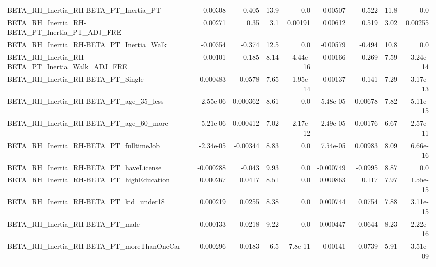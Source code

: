 \begin{tabular}{lrrrrrrrr}
BETA\_RH\_Inertia\_RH-BETA\_PT\_Inertia\_PT              &    -0.00308 &       -0.405 &     13.9 &      0.0 &   -0.00507 &      -0.522 &         11.8 &           0.0 \\
BETA\_RH\_Inertia\_RH-BETA\_PT\_Inertia\_PT\_ADJ\_FRE      &     0.00271 &         0.35 &      3.1 &  0.00191 &    0.00612 &       0.519 &         3.02 &       0.00255 \\
BETA\_RH\_Inertia\_RH-BETA\_PT\_Inertia\_Walk            &    -0.00354 &       -0.374 &     12.5 &      0.0 &   -0.00579 &      -0.494 &         10.8 &           0.0 \\
BETA\_RH\_Inertia\_RH-BETA\_PT\_Inertia\_Walk\_ADJ\_FRE    &     0.00101 &        0.185 &     8.14 & 4.44e-16 &    0.00166 &       0.269 &         7.59 &      3.24e-14 \\
BETA\_RH\_Inertia\_RH-BETA\_PT\_Single                  &    0.000483 &       0.0578 &     7.65 & 1.95e-14 &    0.00137 &       0.141 &         7.29 &      3.17e-13 \\
BETA\_RH\_Inertia\_RH-BETA\_PT\_age\_35\_less             &    2.55e-06 &     0.000362 &     8.61 &      0.0 &  -5.48e-05 &    -0.00678 &         7.82 &      5.11e-15 \\
BETA\_RH\_Inertia\_RH-BETA\_PT\_age\_60\_more             &    5.21e-06 &     0.000412 &     7.02 & 2.17e-12 &   2.49e-05 &     0.00176 &         6.67 &      2.57e-11 \\
BETA\_RH\_Inertia\_RH-BETA\_PT\_fulltimeJob             &   -2.34e-05 &     -0.00344 &     8.83 &      0.0 &   7.64e-05 &     0.00983 &         8.09 &      6.66e-16 \\
BETA\_RH\_Inertia\_RH-BETA\_PT\_haveLicense             &   -0.000288 &       -0.043 &     9.93 &      0.0 &  -0.000749 &     -0.0995 &         8.87 &           0.0 \\
BETA\_RH\_Inertia\_RH-BETA\_PT\_highEducation           &    0.000267 &       0.0417 &     8.51 &      0.0 &   0.000863 &       0.117 &         7.97 &      1.55e-15 \\
BETA\_RH\_Inertia\_RH-BETA\_PT\_kid\_under18             &    0.000219 &       0.0255 &     8.38 &      0.0 &   0.000744 &      0.0754 &         7.88 &      3.11e-15 \\
BETA\_RH\_Inertia\_RH-BETA\_PT\_male                    &   -0.000133 &      -0.0218 &     9.22 &      0.0 &  -0.000447 &     -0.0644 &         8.23 &      2.22e-16 \\
BETA\_RH\_Inertia\_RH-BETA\_PT\_moreThanOneCar          &   -0.000296 &      -0.0183 &      6.5 &  7.8e-11 &   -0.00141 &     -0.0739 &         5.91 &      3.51e-09 \\

\end{tabular}
